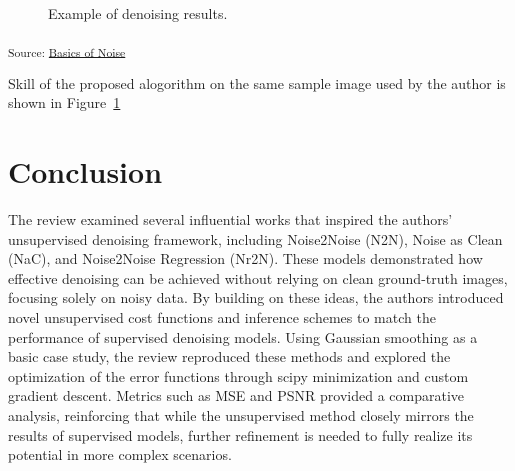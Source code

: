 \documentclass[
]{agujournal2019}
\begin{document}
\begin{figure}[H]


\caption{\label{fig-denoising-plot}Example of denoising results.}

\end{figure}%

\textsubscript{Source:
\href{https://sijuswamy.github.io/Denoising-Manuscript/notebooks/review-preview.html\#cell-fig-denoising-plot}{Basics
of Noise}}

Skill of the proposed alogorithm on the same sample image used by the
author is shown in Figure~\ref{fig-denoising-plot}

\section{Conclusion}\label{conclusion}

The review examined several influential works that inspired the authors'
unsupervised denoising framework, including Noise2Noise (N2N), Noise as
Clean (NaC), and Noise2Noise Regression (Nr2N). These models
demonstrated how effective denoising can be achieved without relying on
clean ground-truth images, focusing solely on noisy data. By building on
these ideas, the authors introduced novel unsupervised cost functions
and inference schemes to match the performance of supervised denoising
models. Using Gaussian smoothing as a basic case study, the review
reproduced these methods and explored the optimization of the error
functions through scipy minimization and custom gradient descent.
Metrics such as MSE and PSNR provided a comparative analysis,
reinforcing that while the unsupervised method closely mirrors the
results of supervised models, further refinement is needed to fully
realize its potential in more complex scenarios.
\end{document}
